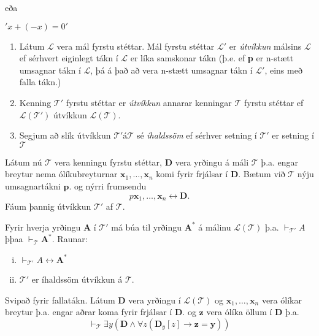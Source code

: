 \documentclass[12pt]{book}
\begin{document}
eða

$'x + (-x) = 0'$


\begin{skgr}
\begin{enumerate}
	\item Látum $\mathcal{L}$ vera mál fyrstu stéttar. Mál fyrstu stéttar $\mathcal{L}'$ er \emph{útvíkkun} málsins $\mathcal{L}$
		ef sérhvert eiginlegt tákn í $\mathcal{L}$ er líka samskonar tákn (þ.e. ef \textbf{p} er n-stætt umsagnar tákn í $\mathcal{L}$,
		þá á það að vera n-stætt umsagnar tákn í $\mathcal{L}'$, eins með falla tákn.)
	\item Kenning \(\mathcal{T}'\) fyrstu stéttar er \emph{útvíkkun} annarar kenningar \(\mathcal{T}\) fyrstu stéttar ef $\mathcal{L(T')}$
		útvíkkun $\mathcal{L(T)}$.
	\item Segjum að slík útvíkkun $\mathcal{T'} á \mathcal{T}$ sé \emph{íhaldssöm} ef sérhver setning í $\mathcal{T'}$
		er setning í $\mathcal{T}$
\end{enumerate}
\end{skgr}

Látum nú $\mathcal{T}$ vera kenningu fyrstu stéttar, $\mathbf{D}$ vera yrðingu á máli $\mathcal{T}$ þ.a. engar breytur nema ólíkubreyturnar
$\mathbf{x}_1, \dotsc, \mathbf{x}_n$ komi fyrir frjálsar í $\mathbf{D}$. Bætum við $\mathcal{T}$ nýju umsagnartákni $\mathbf{p}$.
og nýrri frumsendu
\[ p \mathbf{x}_1, \dotsc, \mathbf{x}_n \leftrightarrow \mathbf{D} .\]
Fáum þannig útvíkkun $\mathcal{T'}$ af $\mathcal{T}$.

\begin{setn}
Fyrir hverja yrðingu $\mathbf{A}$ í $\mathcal{T'}$ má búa til yrðingu $\mathbf{A}^{*}$ á málinu $\mathcal{L(T)}$
þ.a. $\vdash_{\mathcal{T'}} A$ þþaa $\vdash_{\mathcal{T}} \mathbf{A}^{*}$. Raunar:

\begin{enumerate}[(i)]
\item $\vdash_{\mathcal{T'}} A \leftrightarrow \mathbf{A}^{*}$
\item $\mathcal{T'}$ er íhaldssöm útvíkkun á $\mathcal{T}$.
\end{enumerate}

\end{setn}


Svipað fyrir fallatákn. Látum $\mathbf{D}$ vera yrðingu í
$\mathcal{L(T)}$ og $\mathbf{x}_1, \dotsc, \mathbf{x}_n$
vera ólíkar breytur þ.a. engar aðrar koma fyrir frjálsar í 
$\mathbf{D}$. og $\mathbf{z}$ vera ólíka öllum í $\mathbf{D}$
þ.a.
\[ \vdash_{\mathcal{T}} \exists y ( \mathbf{D} \wedge \forall z ( \mathbf{D}_{y} [z] \rightarrow \mathbf{z} = \mathbf{y})) \]
\end{document}
